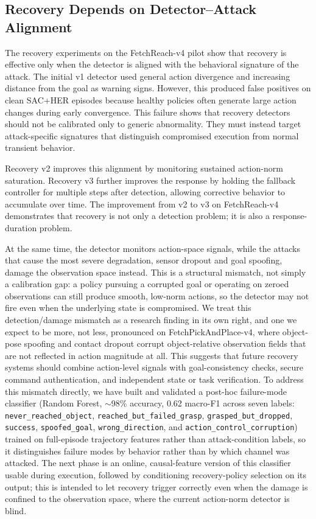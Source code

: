 \documentclass[conference]{IEEEtran}
\begin{document}
\subsection{Recovery Depends on Detector--Attack Alignment}

The recovery experiments on the FetchReach-v4 pilot show that recovery is effective
only when the detector is aligned with the behavioral signature of the attack. The
initial v1 detector used general action divergence and increasing distance from the
goal as warning signs. However, this produced false positives on clean SAC+HER episodes
because healthy policies often generate large action changes during early convergence.
This failure shows that recovery detectors should not be calibrated only to generic
abnormality. They must instead target attack-specific signatures that distinguish
compromised execution from normal transient behavior.

Recovery v2 improves this alignment by monitoring sustained action-norm saturation.
Recovery v3 further improves the response by holding the fallback controller for
multiple steps after detection, allowing corrective behavior to accumulate over time.
The improvement from v2 to v3 on FetchReach-v4 demonstrates that recovery is not only a
detection problem; it is also a response-duration problem.

At the same time, the detector monitors action-space signals, while the attacks that
cause the most severe degradation, sensor dropout and goal spoofing, damage the
observation space instead. This is a structural mismatch, not simply a calibration gap:
a policy pursuing a corrupted goal or operating on zeroed observations can still
produce smooth, low-norm actions, so the detector may not fire even when the underlying
state is compromised. We treat this detection/damage mismatch as a research finding in
its own right, and one we expect to be more, not less, pronounced on
FetchPickAndPlace-v4, where object-pose spoofing and contact dropout corrupt
object-relative observation fields that are not reflected in action magnitude at all.
This suggests that future recovery systems should combine action-level signals with
goal-consistency checks, secure command authentication, and independent state or task
verification. To address this mismatch directly, we have built and validated a
post-hoc failure-mode classifier (Random Forest, $\sim$98\% accuracy, 0.62 macro-F1
across seven labels: \texttt{never\_reached\_object}, \texttt{reached\_but\_failed\_grasp},
\texttt{grasped\_but\_dropped}, \texttt{success}, \texttt{spoofed\_goal},
\texttt{wrong\_direction}, and \texttt{action\_control\_corruption}) trained on
full-episode trajectory features rather than attack-condition labels, so it
distinguishes failure modes by behavior rather than by which channel was attacked. The
next phase is an online, causal-feature version of this classifier usable during
execution, followed by conditioning recovery-policy selection on its output; this is
intended to let recovery trigger correctly even when the damage is confined to the
observation space, where the current action-norm detector is blind.
\end{document}
